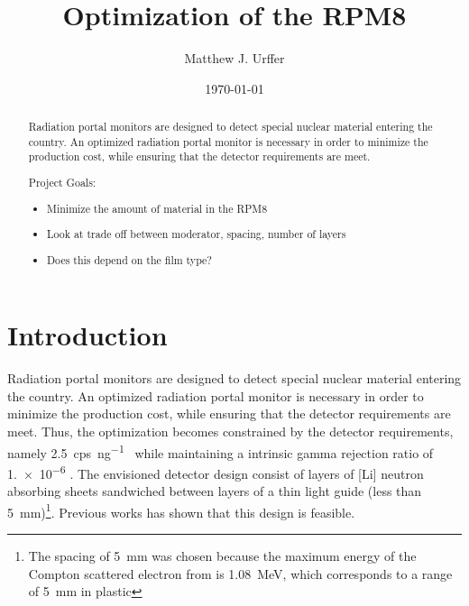 \documentclass[draftcls,onecolumn]{IEEEtran}
\begin{document}
\title{Optimization of the RPM8}
\author{Matthew J. Urffer}
\date{\today}

\maketitle
\begin{abstract}
Radiation portal monitors are designed to detect special nuclear material entering the country.
An optimized radiation portal monitor is necessary in order to minimize the production cost, while ensuring that the detector requirements are meet.

Project Goals:
\begin{itemize}
	\item Minimize the amount of material in the RPM8
	\item Look at trade off between moderator, spacing, number of layers
	\item Does this depend on the film type?
\end{itemize}
\end{abstract}

\IEEEpeerreviewmaketitle

\pagebreak
\tableofcontents
\listoftodos
\listoffigures
\listoftables
\lstlistoflistings
\pagebreak

\section{Introduction}
Radiation portal monitors are designed to detect special nuclear material entering the country.
An optimized radiation portal monitor is necessary in order to minimize the production cost, while ensuring that the detector requirements are meet.
Thus, the optimization becomes constrained by the detector requirements, namely \SI{2.5}{cps\per\nano\gram{}} while maintaining a intrinsic gamma rejection ratio of \num{1.e-6}  \cite{kouzes_neutron_2010,kouzes_neutron_1999}.
The envisioned detector design consist of layers of [Li] neutron absorbing sheets sandwiched between layers of a thin light guide (less than \SI{5}{\milli \meter})\footnote{The spacing of \SI{5}{\milli \meter} was chosen because the maximum energy of the Compton scattered electron from  is \SI{1.08}{\mega \electronvolt}, which corresponds to a range of \SI{5}{\milli \meter} in plastic}.
Previous works has shown that this design is feasible.
 





\pagebreak
\appendix

\end{document}
